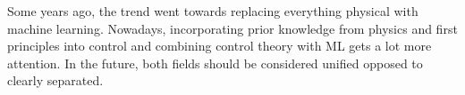 		Some years ago, the trend went towards replacing everything physical with machine learning. Nowadays, incorporating prior knowledge from physics and first principles into control and combining control theory with ML gets a lot more attention. In the future, both fields should be considered unified opposed to clearly separated.
